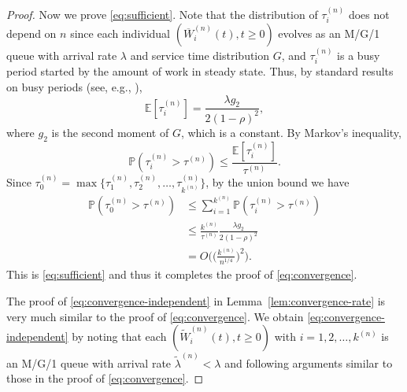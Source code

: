 \documentclass[sigconf]{acmart}
\renewcommand{\Pr}{\mathbb{P}} %
\newcommand{\expect}{\mathbb{E}} %
\newcommand{\supn}{^{(n)}}
\begin{document}
\begin{proof}
Now we prove \eqref{eq:sufficient}.  Note that the distribution of $\tau\supn_i$ does not depend on $n$ since each individual $(\overline{W}\supn_i(t),t\ge 0)$ evolves as an M/G/1 queue with arrival rate $\lambda$ and service time distribution $G$, and $\tau\supn_i$ is a busy period started by the amount of work in steady state. Thus, by standard results on busy periods (see, e.g., \cite{Har_13}),
\begin{equation}\label{eq:busy}
\expect[\tau\supn_i]=\frac{\lambda g_2}{2(1-\rho)^2},
\end{equation}
where $g_2$ is the second moment of $G$, which is a constant.  By Markov's inequality,
\begin{equation}
\Pr(\tau\supn_i>\tau\supn)\le \frac{\expect[\tau\supn_i]}{\tau\supn}.
\end{equation}
Since $\tau\supn_0=\max\{\tau\supn_1,\tau\supn_2,\dots,\tau\supn_{k\supn}\}$, by the union bound we have
\begin{align*}
\Pr(\tau\supn_0 > \tau\supn)&\le \sum_{i=1}^{k\supn}\Pr(\tau\supn_i > \tau\supn)\\
&\le \frac{k\supn}{\tau\supn}\frac{\lambda g_2}{2(1-\rho)^2}\\
&=O\Biggl(\biggl(\frac{k\supn}{n^{1/4}}\biggr)^2\Biggr).
\end{align*}
This is \eqref{eq:sufficient} and thus it completes the proof of \eqref{eq:convergence}.


The proof of \eqref{eq:convergence-independent} in Lemma~\ref{lem:convergence-rate} is very much similar to the proof of \eqref{eq:convergence}. We obtain \eqref{eq:convergence-independent} by noting that each $(\widetilde{W}\supn_i(t),t\ge 0)$ with $i=1,2,\dots,k\supn$ is an M/G/1 queue with arrival rate $\widetilde{\lambda}\supn<\lambda$ and following arguments similar to those in the proof of \eqref{eq:convergence}.
\end{proof}
\end{document}
